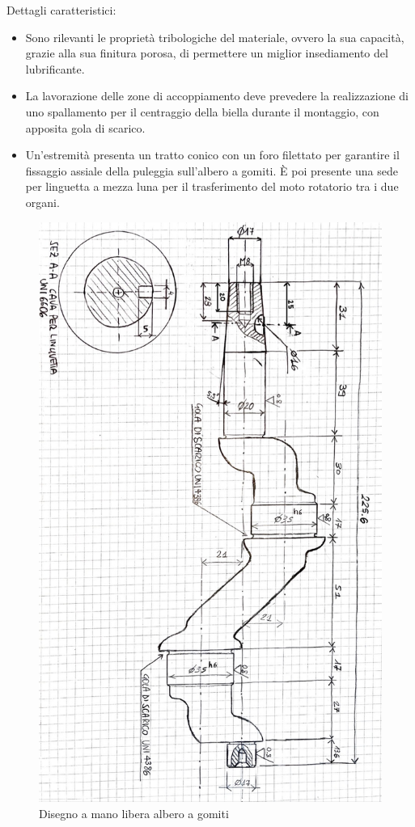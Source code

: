 Dettagli caratteristici:
\begin{itemize}
    \item Sono rilevanti le proprietà tribologiche del materiale, ovvero la sua capacità, grazie alla sua finitura porosa, di permettere un miglior insediamento del lubrificante.
    \item La lavorazione delle zone di accoppiamento deve prevedere la realizzazione di uno spallamento per il centraggio della biella durante il montaggio, con apposita gola di scarico. 
    \item Un’estremità presenta un tratto conico con un foro filettato per garantire il fissaggio assiale della puleggia sull’albero a gomiti. È poi presente una sede per linguetta a mezza luna per il trasferimento del moto rotatorio tra i due organi. 
\end{itemize}
\begin{figure}[h]
    \centering
    \includegraphics[scale=0.3, angle=90]{Immagini/SchizzoAlbero.jpg}
    \caption{Disegno a mano libera albero a gomiti}
    \label{fig:SchizzoAlbero}
\end{figure}
